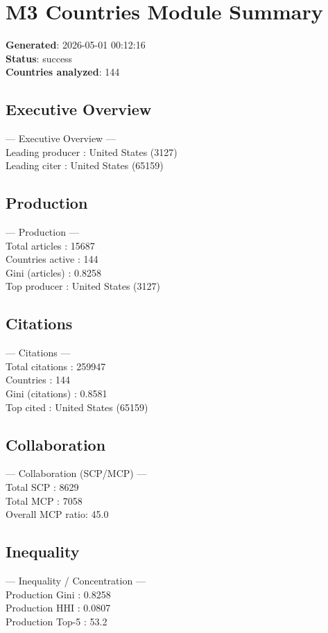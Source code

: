 \section*{M3 Countries Module Summary}
\textbf{Generated}: 2026-05-01 00:12:16\\
\textbf{Status}: success\\
\textbf{Countries analyzed}: 144\\

\subsection*{Executive Overview}
--- Executive Overview ---\\  Leading producer  : United States (3127)\\  Leading citer     : United States (65159)

\subsection*{Production}
--- Production ---\\  Total articles   : 15687\\  Countries active : 144\\  Gini (articles)  : 0.8258\\  Top producer     : United States (3127)

\subsection*{Citations}
--- Citations ---\\  Total citations  : 259947\\  Countries        : 144\\  Gini (citations) : 0.8581\\  Top cited        : United States (65159)

\subsection*{Collaboration}
--- Collaboration (SCP/MCP) ---\\  Total SCP        : 8629\\  Total MCP        : 7058\\  Overall MCP ratio: 45.0%

\subsection*{Inequality}
--- Inequality / Concentration ---\\  Production Gini  : 0.8258\\  Production HHI   : 0.0807\\  Production Top-5 : 53.2%

